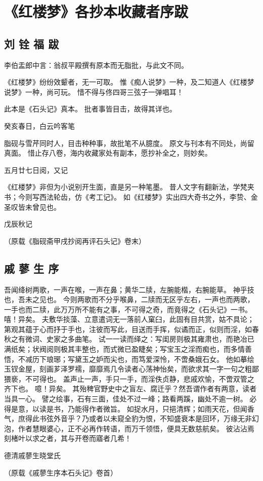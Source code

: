 \chapter{《红楼梦》各抄本收藏者序跋}
\section*{刘 铨 福 跋}
李伯盂郎中言：翁叔平殿撰有原本而无脂批，与此文不同。
\par
《红楼梦》纷纷效颦者，无一可取。
惟《痴人说梦》一种，及二知道人《红楼梦说梦》一种，尚可玩。
惜不得与佟四哥三弦子一弹唱耳！\par
此本是《石头记》真本。
批者事皆目击，故得其详也。
\par
癸亥春日，白云吟客笔\par
\hop
脂砚与雪芹同时人，目击种种事，故批笔不从臆度。
原文与刊本有不同处，尚留真面。
惜止存八卷，海内收藏家处有副本，愿抄补全之，则妙矣。
\par
五月廿七日阅，又记\par
\hop
《红楼梦》非但为小说别开生面，直是另一种笔墨。
昔人文字有翻新法，学梵夹书；今则写西法轮齿，仿《考工记》。
如《红楼梦》实出四大奇书之外，李贽、金圣叹皆未曾见也。
\par
戊辰秋记\par
（原载《脂砚斋甲戌抄阅再评石头记》卷末）\par

\section*{戚 蓼 生 序}
吾闻绛树两歌，一声在喉，一声在鼻；黄华二牍，左腕能楷，右腕能草。
神乎技也，吾未之见也。
今则两歌而不分乎喉鼻，二牍而无区乎左右，一声也而两歌，一手也而二牍，此万万所不能有之事，不可得之奇，而竟得之《石头记》一书。
嘻！异矣。
夫敷华掞藻、立意遣词无一落前人窠臼，此固有目共赏，姑不具论；第观其蕴于心而抒于手也，注彼而写此，目送而手挥，似谲而正，似则而淫，如春秋之有微词、史家之多曲笔。
试一一读而绎之：写闺房则极其雍肃也，而艳冶已满纸矣；状阀阅则极其丰整也，而式微已盈睫矣；写宝玉之淫而痴也，而多情善悟，不减历下琅琊；写黛玉之妒而尖也，而笃爱深怜，不啻桑娥石女。
他如摹绘玉钗金屋，刻画芗泽罗襦，靡靡焉几令读者心荡神怡矣，而欲求其一字一句之粗鄙猥亵，不可得也。
盖声止一声，手只一手，而淫佚贞静，悲戚欢愉，不啻双管之齐下也。
噫！异矣。
其殆稗官野史中之盲左、腐迁乎？然吾谓作者有两意，读者当具一心。
譬之绘事，石有三面，佳处不过一峰；路看两蹊，幽处不逾一树。
必得是意，以读是书，乃能得作者微旨。
如捉水月，只挹清辉；如雨天花，但闻香气，庶得此书弦外音乎？乃或者以未窥全豹为恨，不知盛衰本是回环，万缘无非幻泡，作者慧眼婆心，正不必再作转语，而万千领悟，便具无数慈航矣。
彼沾沾焉刻楮叶以求之者，其与开卷而寤者几希！\par
德清戚蓼生晓堂氏\par
（原载《戚蓼生序本石头记》卷首）\par
